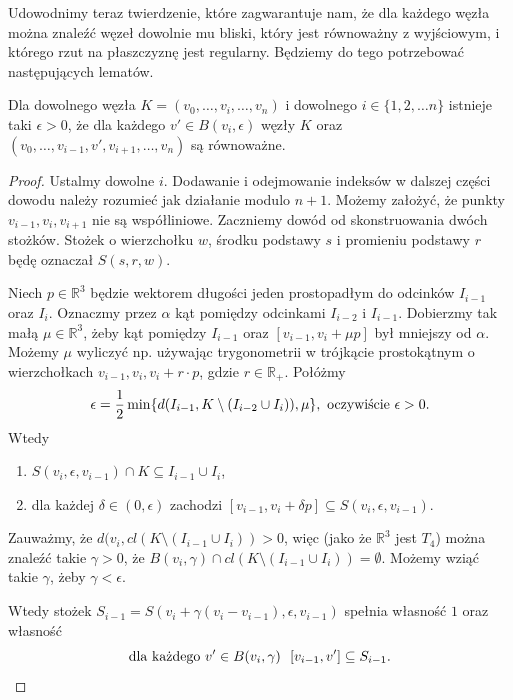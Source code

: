 Udowodnimy teraz twierdzenie, które zagwarantuje nam, że dla każdego węzła można znaleźć węzeł dowolnie mu bliski, który jest równoważny z wyjściowym, i którego rzut na płaszczyznę jest regularny. 
Będziemy do tego potrzebować następujących lematów.

\begin{lemat}
\label{LEM1}
 Dla dowolnego węzła $K = (v_0, \ldots, v_i, \ldots, v_n)$ i dowolnego $i\in\lbrace 1,2,\ldots n\rbrace$ istnieje taki $\epsilon > 0$, że dla każdego $v'\in B(v_i, \epsilon)$ 
 węzły $K$ oraz $(v_0, \ldots,v_{i-1}, v', v_{i+1}, \ldots, v_n)$ są równoważne.
\end{lemat}
\begin{proof}

Ustalmy dowolne $i$. Dodawanie i odejmowanie indeksów w dalszej części dowodu należy rozumieć jak działanie modulo $n+1$. Możemy założyć, że punkty $v_{i-1}, v_i, v_{i+1}$ nie są
współliniowe. Zaczniemy dowód od skonstruowania dwóch stożków.
Stożek o wierzchołku $w$, środku podstawy $s$ i promieniu podstawy $r$ będę oznaczał $S(s,r,w)$. 

Niech $p\in\mathbb{R}^3$ będzie wektorem długości jeden prostopadłym do odcinków $I_{i-1}$ oraz $I_i$. Oznaczmy przez $\alpha$ kąt pomiędzy odcinkami 
$I_{i-2}$ i $I_{i-1}$. 
Dobierzmy tak małą $\mu\in\mathbb{R}^3$, żeby kąt pomiędzy $I_{i-1}$ oraz $[v_{i-1}, v_i + \mu p]$ był mniejszy od $\alpha$. Możemy $\mu$ wyliczyć np. używając trygonometrii 
w trójkącie prostokątnym o wierzchołkach $v_{i-1}, v_i, v_i + r\cdot p$, gdzie $r\in\mathbb{R}_+$. Połóżmy
\begin{displaymath}
 \epsilon = \frac{1}{2}\min\lbrace d(I_{i-1}, K\setminus(I_{i-2}\cup I_i)), \mu\rbrace, \hbox{ oczywiście }\epsilon>0.
\end{displaymath}
Wtedy
\begin{enumerate}
 \item $S(v_i, \epsilon, v_{i-1})\cap K \subseteq I_{i-1}\cup I_i$,
 \item dla każdej $\delta\in(0,\epsilon)$ zachodzi $[v_{i-1}, v_i+\delta p]\subseteq S(v_i, \epsilon, v_{i-1})$.
\end{enumerate}
Zauważmy, że $d(v_i, cl(K\setminus(I_{i-1}\cup I_i)) > 0$, więc (jako że $\mathbb{R}^3$ jest $T_4$) można znaleźć takie
$\gamma > 0$, że $B(v_i,\gamma)\cap cl(K\setminus(I_{i-1}\cup I_i)) = \emptyset$. Możemy wziąć takie $\gamma$, żeby $\gamma < \epsilon$.

Wtedy stożek 
$S_{i-1} = S(v_i + \gamma(v_i-v_{i-1}), \epsilon, v_{i-1})$ spełnia własność $1$ oraz własność
\begin{displaymath}
 \hbox{dla każdego }v'\in B(v_i, \gamma) \ \ [v_{i-1}, v']\subseteq S_{i-1}.
\end{displaymath}



\end{proof}
